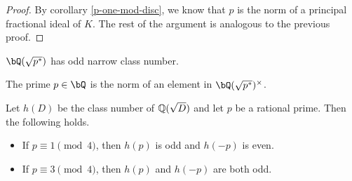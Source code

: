 \begin{proof}
    By corollary \ref{p-one-mod-disc}, we know that $p$ is the norm of a principal fractional ideal of $K$. The rest of the argument is analogous to the previous proof.
\end{proof}


\begin{prop}
$\bQ(\sqrt{p^*})$ has odd narrow class number.
\end{prop}    

\begin{cor}\label{p-norm}
The prime $p \in \bQ$ is the norm of an element in $\bQ(\sqrt{p^*})^{\times}$.
\end{cor}

\begin{thm}\label{thm_class_number}
    Let $h(D)$ be the class number of $\mathbb{Q}(\sqrt{D})$ and let $p$ be a rational prime. Then the following holds.
    \begin{itemize}
        \item If $p\equiv1\pmod{4}$, then $h(p)$ is odd and $h(-p)$ is even.
        \item If $p\equiv3\pmod{4}$, then $h(p)$ and $h(-p)$ are both odd.
    \end{itemize}
\end{thm}
